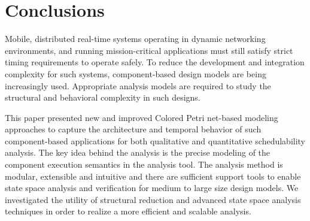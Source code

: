 \section{Conclusions}
\label{sec:Conclusions}

Mobile, distributed real-time systems operating in dynamic networking environments, and running mission-critical applications must still satisfy strict timing requirements to operate safely. To reduce the development and integration complexity for such systems, component-based design models are being increasingly used. Appropriate analysis models are required to study the structural and behavioral complexity in such designs. 

This paper presented new and improved Colored Petri net-based modeling approaches to capture the architecture and temporal behavior of such component-based applications for both qualitative and quantitative schedulability analysis. The key idea behind the analysis is the precise modeling of the component execution semantics in the analysis tool. The analysis method is modular, extensible and intuitive and there are sufficient support tools to enable state space analysis and verification for medium to large size design models. We investigated the utility of structural reduction and advanced state space analysis techniques in order to realize a more efficient and scalable analysis. 